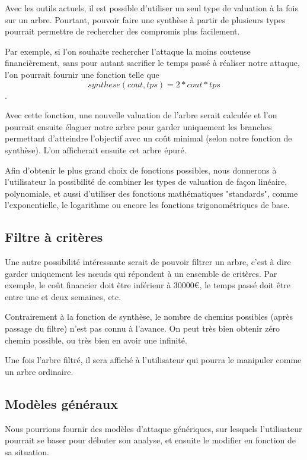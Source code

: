         Avec les outils actuels, il est possible d'utiliser un seul type de valuation à la fois sur un arbre. Pourtant, pouvoir faire une synthèse à partir de plusieurs types pourrait permettre de rechercher des compromis plus facilement.

        Par exemple, si l'on souhaite rechercher l'attaque la moins couteuse financièrement, sans pour autant sacrifier le temps passé à réaliser notre attaque, l'on pourrait fournir une fonction telle que \[ synthese(cout, tps) = 2*cout*tps \]. 

        Avec cette fonction, une nouvelle valuation de l'arbre serait calculée et l'on pourrait ensuite élaguer notre arbre pour garder uniquement les branches permettant d'atteindre l'objectif avec un coût minimal (selon notre fonction de synthèse). L'on afficherait ensuite cet arbre épuré.

        Afin d'obtenir le plus grand choix de fonctions possibles, nous donnerons à l'utilisateur la possibilité de combiner les types de valuation de façon linéaire, polynomiale, et aussi d'utiliser des fonctions mathématiques "standards", comme l'exponentielle, le logarithme ou encore les fonctions trigonométriques de base.

    \subsection{Filtre à critères}
        \label{sec:filtre}

        Une autre possibilité intéressante serait de pouvoir filtrer un arbre, c'est à dire garder uniquement les nœuds qui répondent à un ensemble de critères. Par exemple, le coût financier doit être inférieur à 30000\euro{}, le temps passé doit être entre une et deux semaines, etc.

        Contrairement à la fonction de synthèse, le nombre de chemins possibles (après passage du filtre) n'est pas connu à l'avance. On peut très bien obtenir zéro chemin possible, ou très bien en avoir une infinité.

        Une fois l'arbre filtré, il sera affiché à l'utilisateur qui pourra le manipuler comme un arbre ordinaire.

    \subsection{Modèles généraux}
        \label{sec:modele}

        Nous pourrions fournir des modèles d'attaque génériques, sur lesquels l'utilisateur pourrait se baser pour débuter son analyse, et ensuite le modifier en fonction de sa situation.

